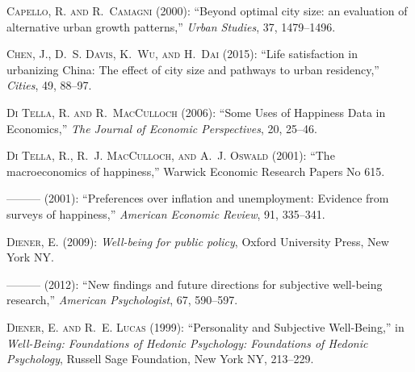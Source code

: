 \documentclass[12pt, letterpaper]{article}
\begin{document}
\begin{spacing}{1.9}
\begin{thebibliography}{77}
\textsc{Capello, R. and R.~Camagni} (2000): \enquote{Beyond optimal city size:
  an evaluation of alternative urban growth patterns,} \emph{Urban Studies},
  37, 1479--1496.

\textsc{Chen, J., D.~S. Davis, K.~Wu, and H.~Dai} (2015): \enquote{Life
  satisfaction in urbanizing China: The effect of city size and pathways to
  urban residency,} \emph{Cities}, 49, 88--97.

\textsc{{Di Tella}, R. and R.~MacCulloch} (2006): \enquote{Some Uses of
  Happiness Data in Economics,} \emph{The Journal of Economic Perspectives},
  20, 25--46.

\textsc{{Di Tella}, R., R.~J. MacCulloch, and A.~J. Oswald}
  (2001{}): \enquote{The macroeconomics of happiness,} Warwick
  Economic Research Papers No 615.

---\hspace{-.1pt}---\hspace{-.1pt}--- (2001{}):
  \enquote{Preferences over inflation and unemployment: Evidence from surveys
  of happiness,} \emph{American Economic Review}, 91, 335--341.

\textsc{Diener, E.} (2009): \emph{Well-being for public policy}, Oxford
  University Press, New York NY.

---\hspace{-.1pt}---\hspace{-.1pt}--- (2012): \enquote{New findings and future
  directions for subjective well-being research,} \emph{American Psychologist},
  67, 590--597.

\textsc{Diener, E. and R.~E. Lucas} (1999): \enquote{Personality and Subjective
  Well-Being,} in \emph{Well-Being: Foundations of Hedonic Psychology:
  Foundations of Hedonic Psychology}, Russell Sage Foundation, New York NY,
  213--229.


\end{thebibliography}
\end{spacing}
\end{document}
